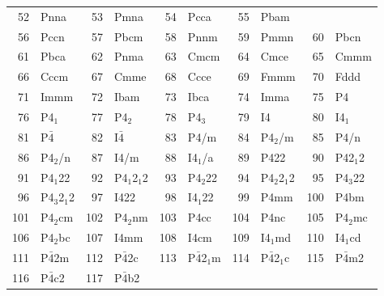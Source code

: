 \documentclass[final,12pt]{article}
\begin{document}
{{{{{{\begin{table}[h!]
\begin{center}
\begin{tabular}{||r|l||r|l||r|l||r|l||r|l||}
52     & Pnna               & 
53     & Pmna               & 
54     & Pcca               & 
55     & Pbam               \\
56     & Pccn               & 
57     & Pbcm               & 
58     & Pnnm               & 
59     & Pmmn               & 
60     & Pbcn               \\
61     & Pbca               & 
62     & Pnma               & 
63     & Cmcm               & 
64     & Cmce               & 
65     & Cmmm               \\
66     & Cccm               & 
67     & Cmme               & 
68     & Ccce               & 
69     & Fmmm               & 
70     & Fddd               \\
71     & Immm               & 
72     & Ibam               & 
73     & Ibca               & 
74     & Imma               & 
75     & P4                 \\
76     & P4$_1$             & 
77     & P4$_2$             & 
78     & P4$_3$             & 
79     & I4                 & 
80     & I4$_1$             \\
81     & P$\bar{4}$                & 
82     & I$\bar{4}$                & 
83     & P4/m               & 
84     & P4$_2$/m           & 
85     & P4/n               \\
86     & P4$_2$/n           & 
87     & I4/m               & 
88     & I4$_1$/a           & 
89     & P422               & 
90     & P42$_1$2           \\
91     & P4$_1$22           & 
92     & P4$_1$2$_1$2       & 
93     & P4$_2$22           & 
94     & P4$_2$2$_1$2       & 
95     & P4$_3$22           \\
96     & P4$_3$2$_1$2       & 
97     & I422               & 
98     & I4$_1$22           & 
99     & P4mm               & 
100    & P4bm               \\
101    & P4$_2$cm           & 
102    & P4$_2$nm           & 
103    & P4cc               & 
104    & P4nc               & 
105    & P4$_2$mc           \\
106    & P4$_2$bc           & 
107    & I4mm               & 
108    & I4cm               & 
109    & I4$_1$md           & 
110    & I4$_1$cd           \\
111    & P$\bar{4}$2m              & 
112    & P$\bar{4}$2c              & 
113    & P$\bar{4}$2$_1$m          & 
114    & P$\bar{4}$2$_1$c          & 
115    & P$\bar{4}$m2              \\
116    & P$\bar{4}$c2              & 
117    & P$\bar{4}$b2              & 

\end{tabular}
\end{center}
\end{table}}}}}}}
\end{document}
